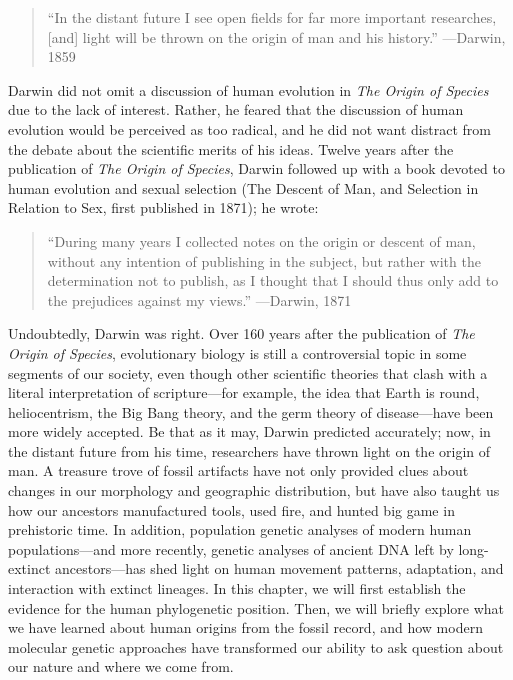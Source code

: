 \documentclass[
]{book}
\begin{document}
\begin{quote}
``In the distant future I see open fields for far more important researches, {[}and{]} light will be thrown on the origin of man and his history.'' ---Darwin, 1859
\end{quote}

Darwin did not omit a discussion of human evolution in \emph{The Origin of Species} due to the lack of interest. Rather, he feared that the discussion of human evolution would be perceived as too radical, and he did not want distract from the debate about the scientific merits of his ideas. Twelve years after the publication of \emph{The Origin of Species}, Darwin followed up with a book devoted to human evolution and sexual selection (The Descent of Man, and Selection in Relation to Sex, first published in 1871); he wrote:

\begin{quote}
``During many years I collected notes on the origin or descent of man, without any intention of publishing in the subject, but rather with the determination not to publish, as I thought that I should thus only add to the prejudices against my views.'' ---Darwin, 1871
\end{quote}

Undoubtedly, Darwin was right. Over 160 years after the publication of \emph{The Origin of Species}, evolutionary biology is still a controversial topic in some segments of our society, even though other scientific theories that clash with a literal interpretation of scripture---for example, the idea that Earth is round, heliocentrism, the Big Bang theory, and the germ theory of disease---have been more widely accepted. Be that as it may, Darwin predicted accurately; now, in the distant future from his time, researchers have thrown light on the origin of man. A treasure trove of fossil artifacts have not only provided clues about changes in our morphology and geographic distribution, but have also taught us how our ancestors manufactured tools, used fire, and hunted big game in prehistoric time. In addition, population genetic analyses of modern human populations---and more recently, genetic analyses of ancient DNA left by long-extinct ancestors---has shed light on human movement patterns, adaptation, and interaction with extinct lineages. In this chapter, we will first establish the evidence for the human phylogenetic position. Then, we will briefly explore what we have learned about human origins from the fossil record, and how modern molecular genetic approaches have transformed our ability to ask question about our nature and where we come from.
\end{document}
